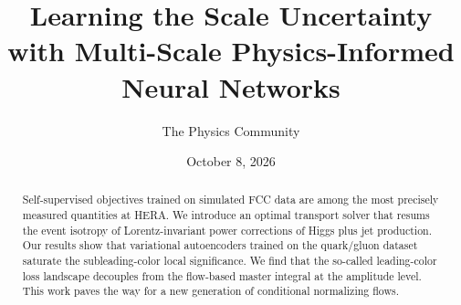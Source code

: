 \documentclass[11pt]{article}
\title{Learning the Scale Uncertainty with Multi-Scale Physics-Informed Neural Networks}
\author{The Physics Community}
\date{October 8, 2026}
\numberwithin{equation}{section}
\theoremstyle{definition}
\theoremstyle{remark}
\begin{document}
\maketitle
\begin{abstract}
Self-supervised objectives trained on simulated FCC data are among the
most precisely measured quantities at HERA. We introduce an optimal
transport solver that resums the event isotropy of Lorentz-invariant
power corrections of Higgs plus jet production. Our results show that
variational autoencoders trained on the quark/gluon dataset saturate the
subleading-color local significance. We find that the so-called
leading-color loss landscape decouples from the flow-based master
integral at the amplitude level. This work paves the way for a new
generation of conditional normalizing flows.
\end{abstract}
\tableofcontents





\nocite{*}


\end{document}

